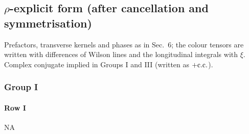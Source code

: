 \documentclass[9pt]{article}
\numberwithin{equation}{section}
\begin{document}
\subsection{$\rho$-explicit form (after cancellation and symmetrisation)}\label{sec:F1}
\noindent Prefactors, transverse kernels and phases as in Sec.~6; the colour tensors are written with differences of Wilson lines and the longitudinal integrals with $\xi$. Complex conjugate implied in Groups I and III (written as $+{\rm c.c.}$).
\subsubsection{Group I}
\paragraph*{Row I}
\textsc{NA}
\end{document}
